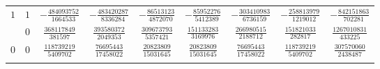 \begin{table}
\begin{center}
\begin{tabular}{ccccccccc}
      $1$  &  $1$  &  $-\frac{ 484093752}{1664533}$  &  $-\frac{ 483420287}{ 8336284}$  &  $-\frac{   86513123}{ 4872070}$  &  $-\frac{  85952276}{ 5412389}$  &  $-\frac{  303410983}{ 6736159}$  &  $-\frac{ 258813979}{ 1219012} $  &  $-\frac{ 842151863}{ 702281}$  \\ \addlinespace
           &  $0$  &  $ \frac{ 368117849}{ 381597}$  &  $ \frac{ 393580372}{ 2049353}$  &  $ \frac{  309673793}{ 5357421}$  &  $ \frac{ 151133283}{ 3169976}$  &  $ \frac{  266980515}{ 2188712}$  &  $ \frac{ 151821033}{  282817} $  &  $ \frac{1267010831}{ 433225}$  \\ \addlinespace
      $0$  &  $0$  &  $ \frac{ 118739219}{5409702}$  &  $ \frac{  76695443}{17458022}$  &  $ \frac{   20823809}{15031645}$  &  $ \frac{  20823809}{15031645}$  &  $ \frac{   76695443}{17458022}$  &  $ \frac{ 118739219}{ 5409702} $  &  $ \frac{ 307570060}{2438487}$  \\ \addlinespace
      \bottomrule
    \end{tabular}
  \end{center}
\end{table}

